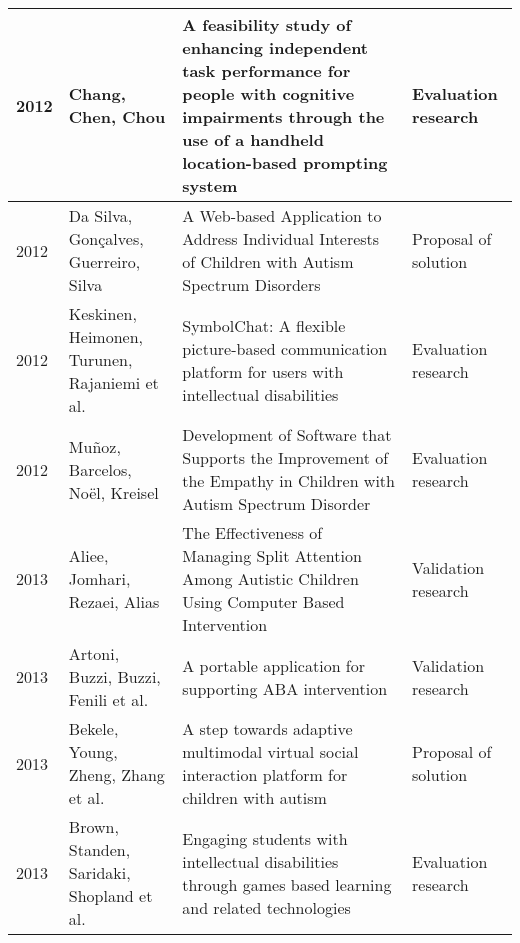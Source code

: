 \documentclass[utf8,english]{gradu3}
\begin{document}
\begin{longtable}{|>{\scriptsize}l|>{\scriptsize}p{3cm}|>{\scriptsize}p{8cm}|>{\scriptsize}p{2.4cm}|}
  2012          & Chang, Chen, Chou                                                    & A feasibility study of enhancing independent task performance for people with cognitive impairments through the use of a handheld location-based prompting system                            & Evaluation research        \\ \hline
  2012          & Da Silva, Gonçalves, Guerreiro, Silva                                & A Web-based Application to Address Individual Interests of Children with Autism Spectrum Disorders                                                                                           & Proposal of solution       \\ \hline
  2012          & Keskinen, Heimonen, Turunen, Rajaniemi et al.                        & SymbolChat: A flexible picture-based communication platform for users with intellectual disabilities                                                                                         & Evaluation research        \\ \hline
  2012          & Muñoz, Barcelos, Noël, Kreisel                                       & Development of Software that Supports the Improvement of the Empathy in Children with Autism Spectrum Disorder                                                                               & Evaluation research        \\ \hline
  2013          & Aliee, Jomhari, Rezaei, Alias                                        & The Effectiveness of Managing Split Attention Among Autistic Children Using Computer Based Intervention                                                                                      & Validation research        \\ \hline
  2013          & Artoni, Buzzi, Buzzi, Fenili et al.                                  & A portable application for supporting ABA intervention                                                                                                                                       & Validation research        \\ \hline
  2013          & Bekele, Young, Zheng, Zhang et al.                                   & A step towards adaptive multimodal virtual social interaction platform for children with autism                                                                                              & Proposal of solution       \\ \hline
  2013          & Brown, Standen, Saridaki, Shopland et al.                            & Engaging students with intellectual disabilities through games based learning and related technologies                                                                                       & Evaluation research        \\ \hline

\end{longtable}
\end{document}
